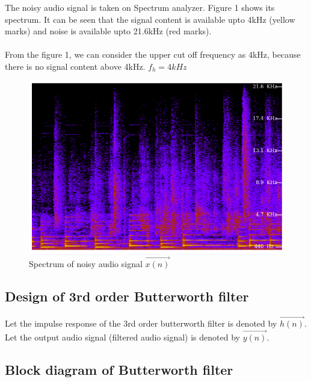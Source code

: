 \documentclass[journal,10pt,twocolumn]{article}
\begin{document}
\vspace{0.25cm}
The noisy audio signal is taken on Spectrum analyzer. Figure 1 shows its spectrum. It can be seen that the signal content is available upto 4kHz (yellow marks) and noise is available upto 21.6kHz (red marks).\\
\vspace{0.25cm}\\
From the figure 1, we can consider the upper cut off frequency as 4kHz, because there is no signal content above 4kHz.
\center
$f_h = 4kHz$
\endcenter{}
\begin{figure}[h]
\includegraphics[width=1\columnwidth]{noisy.png}
\caption{Spectrum of noisy audio signal $\vec{x(n)}$}
\label{fig:Spectrum of noisy audio signal}
\end{figure}
\begin{flushleft}


\section{Design of 3rd order Butterworth filter}

\vspace{0.2cm}
Let the impulse response of the 3rd order butterworth filter is denoted by $\vec{h(n)}$.\\  
\vspace{0.2cm}
Let the output audio signal (filtered audio signal) is denoted by $\vec{y(n)}$.\\ 
\end{flushleft}
\vspace{0.25cm}
\subsection{Block diagram of Butterworth filter} 
\vspace{0.2cm}
\vspace{0.2cm}
    
\end{document}
